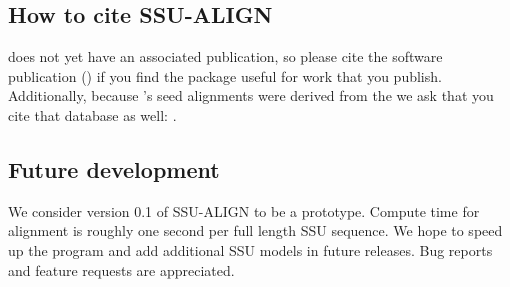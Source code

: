 \subsection{How to cite SSU-ALIGN}

 does not yet have an associated publication,
so please cite the  software publication
(\cite{Nawrocki09}) if you find the package useful for work that
you publish. Additionally, because 's seed alignments were
derived from the  we ask that you cite
that database as well: \cite{CannoneGutell02}. 

\subsection{Future development}

We consider version 0.1 of \textsc{SSU-ALIGN} to be a prototype. 
Compute time for alignment is roughly one second per full length SSU
sequence. We hope to speed up the program and add additional SSU
models in future releases. Bug reports and feature requests are
appreciated.



